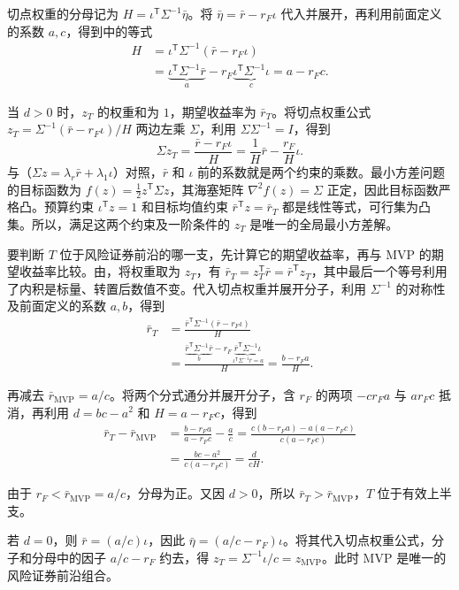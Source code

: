 \begin{solution}[label-content={证明},blank-type=none]
切点权重的分母记为 $H=\iota^{\mathsf T}\Sigma^{-1}\bar\eta$。将 $\bar\eta=\bar r-r_F\iota$ 代入并展开，再利用前面定义的系数 $a,c$，得到中的等式
\[
 \begin{aligned}
 H&=\iota^{\mathsf T}\Sigma^{-1}(\bar r-r_F\iota)\\
  &=\underbrace{\iota^{\mathsf T}\Sigma^{-1}\bar r}_{a}
    -r_F\underbrace{\iota^{\mathsf T}\Sigma^{-1}\iota}_{c}
    =a-r_Fc.
 \end{aligned}
\]

当 $d>0$ 时，$z_T$ 的权重和为 $1$，期望收益率为 $\bar r_T$。将切点权重公式 $z_T=\Sigma^{-1}(\bar r-r_F\iota)/H$ 两边左乘 $\Sigma$，利用 $\Sigma\Sigma^{-1}=I$，得到
\[
 \Sigma z_T=\frac{\bar r-r_F\iota}{H}
 =\frac{1}{H}\bar r-\frac{r_F}{H}\iota.
\]
与（$\Sigma z=\lambda_r\bar r+\lambda_1\iota$）对照，$\bar r$ 和 $\iota$ 前的系数就是两个约束的乘数。最小方差问题的目标函数为 $f(z)=\tfrac12 z^{\mathsf T}\Sigma z$，其海塞矩阵 $\nabla^2f(z)=\Sigma$ 正定，因此目标函数严格凸。预算约束 $\iota^{\mathsf T}z=1$ 和目标均值约束 $\bar r^{\mathsf T}z=\bar r_T$ 都是线性等式，可行集为凸集。所以，满足这两个约束及一阶条件的 $z_T$ 是唯一的全局最小方差解。



要判断 $T$ 位于风险证券前沿的哪一支，先计算它的期望收益率，再与 MVP 的期望收益率比较。由，将权重取为 $z_T$，有 $\bar r_T=z_T^{\mathsf T}\bar r=\bar r^{\mathsf T}z_T$，其中最后一个等号利用了内积是标量、转置后数值不变。代入切点权重并展开分子，利用 $\Sigma^{-1}$ 的对称性及前面定义的系数 $a,b$，得到
\[
 \begin{aligned}
 \bar r_T&=\frac{\bar r^{\mathsf T}\Sigma^{-1}(\bar r-r_F\iota)}{H}\\
 &=\frac{\underbrace{\bar r^{\mathsf T}\Sigma^{-1}\bar r}_{b}
       -r_F\underbrace{\bar r^{\mathsf T}\Sigma^{-1}\iota
              }_{\,\iota^{\mathsf T}\Sigma^{-1}\bar r=a}}{H}
 =\frac{b-r_Fa}{H}.
 \end{aligned}
\]


再减去 $\bar r_{\mathrm{MVP}}=a/c$。将两个分式通分并展开分子，含 $r_F$ 的两项 $-cr_Fa$ 与 $ar_Fc$ 抵消，再利用 $d=bc-a^2$ 和 $H=a-r_Fc$，得到
\[
 \begin{aligned}
 \bar r_T-\bar r_{\mathrm{MVP}}
 &=\frac{b-r_Fa}{a-r_Fc}-\frac ac
 =\frac{c(b-r_Fa)-a(a-r_Fc)}{c(a-r_Fc)}\\
 &=\frac{bc-a^2}{c(a-r_Fc)}=\frac{d}{cH}.
 \end{aligned}
\]

由于 $r_F<\bar r_{\mathrm{MVP}}=a/c$，分母为正。又因 $d>0$，所以 $\bar r_T>\bar r_{\mathrm{MVP}}$，$T$ 位于有效上半支。

若 $d=0$，则 $\bar r=(a/c)\iota$，因此 $\bar\eta=(a/c-r_F)\iota$。将其代入切点权重公式，分子和分母中的因子 $a/c-r_F$ 约去，得 $z_T=\Sigma^{-1}\iota/c=z_{\mathrm{MVP}}$。此时 MVP 是唯一的风险证券前沿组合。
\end{solution}

